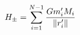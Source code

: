 \documentclass[preview]{standalone}
\begin{document}
\begin{align*}
\special{dvisvgm:raw <g id='unique000'>}H_{\pm} = \sum_{i=1}^{N-1} \frac{G m'_i M_i}{\norm{r'_i}}\special{dvisvgm:raw </g>}
\end{align*}
\end{document}
